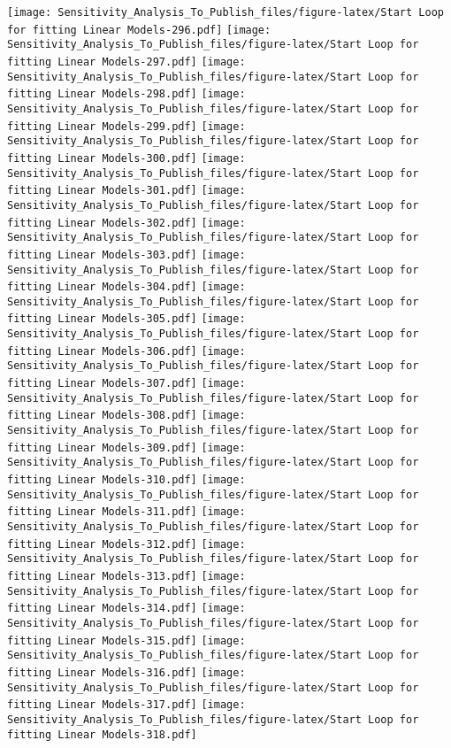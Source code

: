 \documentclass[
]{article}
\begin{document}
\texttt{[image: Sensitivity\_Analysis\_To\_Publish\_files/figure-latex/Start Loop for fitting Linear Models-296.pdf]}
\texttt{[image: Sensitivity\_Analysis\_To\_Publish\_files/figure-latex/Start Loop for fitting Linear Models-297.pdf]}
\texttt{[image: Sensitivity\_Analysis\_To\_Publish\_files/figure-latex/Start Loop for fitting Linear Models-298.pdf]}
\texttt{[image: Sensitivity\_Analysis\_To\_Publish\_files/figure-latex/Start Loop for fitting Linear Models-299.pdf]}
\texttt{[image: Sensitivity\_Analysis\_To\_Publish\_files/figure-latex/Start Loop for fitting Linear Models-300.pdf]}
\texttt{[image: Sensitivity\_Analysis\_To\_Publish\_files/figure-latex/Start Loop for fitting Linear Models-301.pdf]}
\texttt{[image: Sensitivity\_Analysis\_To\_Publish\_files/figure-latex/Start Loop for fitting Linear Models-302.pdf]}
\texttt{[image: Sensitivity\_Analysis\_To\_Publish\_files/figure-latex/Start Loop for fitting Linear Models-303.pdf]}
\texttt{[image: Sensitivity\_Analysis\_To\_Publish\_files/figure-latex/Start Loop for fitting Linear Models-304.pdf]}
\texttt{[image: Sensitivity\_Analysis\_To\_Publish\_files/figure-latex/Start Loop for fitting Linear Models-305.pdf]}
\texttt{[image: Sensitivity\_Analysis\_To\_Publish\_files/figure-latex/Start Loop for fitting Linear Models-306.pdf]}
\texttt{[image: Sensitivity\_Analysis\_To\_Publish\_files/figure-latex/Start Loop for fitting Linear Models-307.pdf]}
\texttt{[image: Sensitivity\_Analysis\_To\_Publish\_files/figure-latex/Start Loop for fitting Linear Models-308.pdf]}
\texttt{[image: Sensitivity\_Analysis\_To\_Publish\_files/figure-latex/Start Loop for fitting Linear Models-309.pdf]}
\texttt{[image: Sensitivity\_Analysis\_To\_Publish\_files/figure-latex/Start Loop for fitting Linear Models-310.pdf]}
\texttt{[image: Sensitivity\_Analysis\_To\_Publish\_files/figure-latex/Start Loop for fitting Linear Models-311.pdf]}
\texttt{[image: Sensitivity\_Analysis\_To\_Publish\_files/figure-latex/Start Loop for fitting Linear Models-312.pdf]}
\texttt{[image: Sensitivity\_Analysis\_To\_Publish\_files/figure-latex/Start Loop for fitting Linear Models-313.pdf]}
\texttt{[image: Sensitivity\_Analysis\_To\_Publish\_files/figure-latex/Start Loop for fitting Linear Models-314.pdf]}
\texttt{[image: Sensitivity\_Analysis\_To\_Publish\_files/figure-latex/Start Loop for fitting Linear Models-315.pdf]}
\texttt{[image: Sensitivity\_Analysis\_To\_Publish\_files/figure-latex/Start Loop for fitting Linear Models-316.pdf]}
\texttt{[image: Sensitivity\_Analysis\_To\_Publish\_files/figure-latex/Start Loop for fitting Linear Models-317.pdf]}
\texttt{[image: Sensitivity\_Analysis\_To\_Publish\_files/figure-latex/Start Loop for fitting Linear Models-318.pdf]}
\end{document}
